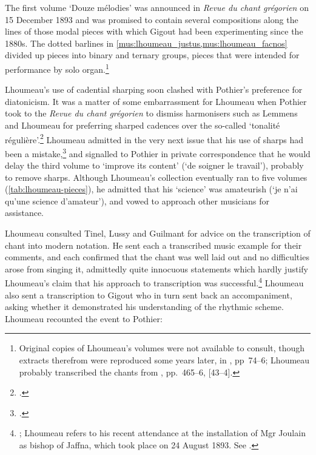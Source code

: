 The first volume `Douze mélodies' was announced in \emph{Revue du chant grégorien} on 15 December 1893 and was promised to contain several compositions along the lines of those modal pieces with which Gigout had been experimenting since the 1880s.
The dotted barlines in \cref{mus:lhoumeau_justus,mus:lhoumeau_facnos} divided up pieces into binary and ternary groups, pieces that were intended for performance by solo organ.\footnote{Original copies of Lhoumeau's volumes were not available to consult, though extracts therefrom were reproduced some years later, in \cite{GastoueTraiteharmonisationchant1910}, pp~74--6; Lhoumeau probably transcribed the chants from \cite{PothierLiberGradualis1883}, pp.~465--6, {[}43--4{]}.}
%

Lhoumeau's use of cadential sharping soon clashed with Pothier's preference for diatonicism.
It was a matter of some embarrassment for Lhoumeau when Pothier took to the \emph{Revue du chant grégorien} to dismiss harmonisers such as Lemmens and Lhoumeau for preferring sharped cadences over the so-called `tonalité régulière'.\footcite[133]{PothiertonaliteSanctusAgnus1894}
Lhoumeau admitted in the very next issue that his use of sharps had been a mistake,\footcite[152]{LhoumeauObservation1894} and signalled to Pothier in private correspondence that he would delay the third volume to `improve its content' (`de soigner le travail'), probably to remove sharps.
Although Lhoumeau's collection eventually ran to five volumes (\cref{tab:lhoumeau-pieces}), he admitted that his `science' was amateurish (`je n'ai qu'une science d'amateur'), and vowed to approach other musicians for assistance.

Lhoumeau consulted Tinel, Lussy and Guilmant for advice on the transcription of chant into modern notation.
He sent each a transcribed music example for their comments, and each confirmed that the chant was well laid out and no difficulties arose from singing it, admittedly quite innocuous statements which hardly justify Lhoumeau's claim that his approach to transcription was successful.\footnote{; Lhoumeau refers to his recent attendance at the installation of Mgr Joulain as bishop of Jaffna, which took place on 24 August 1893. See \cite{ordinationVilatte1907}.\label{fn:joulain}}
\label{int:gigout_lhoumeau}%
Lhoumeau also sent a transcription to Gigout who in turn sent back an accompaniment, asking whether it demonstrated his understanding of the rhythmic scheme.
Lhoumeau recounted the event to Pothier:

